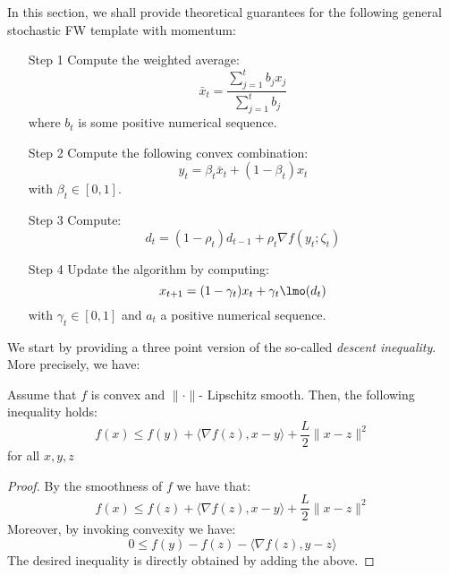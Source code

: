 

In this section, we shall provide theoretical guarantees for the following general stochastic FW template with
momentum:
\begin{itemize}
    \item [Step 1] Compute the weighted average:
    \begin{equation*}
        \bar{x}_{t}=\frac{\sum_{j=1}^{t}b_{j}x_{j}}{\sum_{j=1}^{t}b_{j}}
    \end{equation*}
    where $b_{t}$ is some positive numerical sequence.
    \item [Step 2]
    Compute the following convex combination:
    \begin{equation*}
        y_{t}= \beta_{t}\bar{x}_{t}+(1-\beta_{t})x_{t}
    \end{equation*}
    with $\beta_{t}\in [0,1]$.
    \item [Step 3] Compute:
    \begin{equation*}
        d_{t}=(1-\rho_{t})d_{t-1}+\rho_{t}\nabla f(y_{t};\zeta_{t})
    \end{equation*}
    \item [Step 4] Update the algorithm by computing:
    \begin{equation*}
        x_{t+1}=(1-\gamma_{t})x_{t}+\gamma_{t}\lmo(d_{t}) 
    \end{equation*}
    with $\gamma_{t}\in [0,1]$ and $a_{t}$ a positive numerical sequence.
\end{itemize}
We start by providing a three point version of the so-called \emph{descent inequality}. More precisely, we have:

\begin{lemma}
\label{lem:descent}
Assume that $f$ is convex and $\|\cdot\|$- Lipschitz smooth. Then, the following inequality holds:
\begin{equation}
    f(x)\leq f(y)+\langle \nabla f(z),x-y\rangle+\frac{L}{2}\|x-z\|^{2}
\end{equation}
for all $x,y,z$
\end{lemma}

\begin{proof}
By the smoothness of $f$ we have that:
\begin{equation}
    f(x)\leq f(z)+\langle \nabla f(z),x-y\rangle+\frac{L}{2}\|x-z\|^{2}
\end{equation}
Moreover, by invoking convexity we have:
\begin{equation}
 0\leq f(y)-f(z)-\langle \nabla f(z),y-z\rangle   
\end{equation}
The desired inequality is directly obtained by adding the above.
\end{proof}

